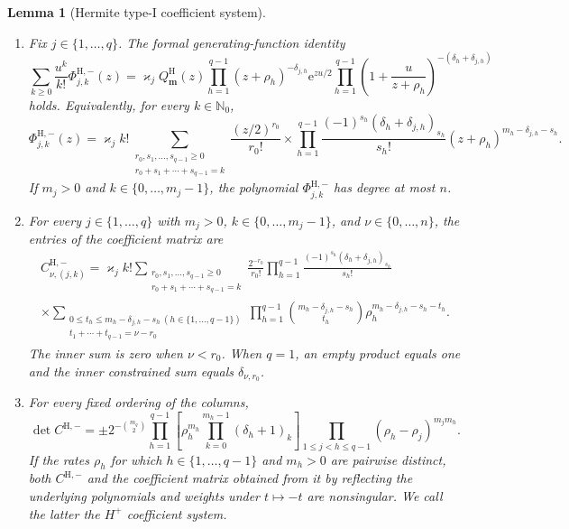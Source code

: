 \documentclass[10pt]{amsart}
\newcommand{\Nzero}{\mathbb N_0}
\newcommand{\e}{\mathrm e}
\newcommand{\mm}{\boldsymbol m}
\theoremstyle{plain}
\newtheorem{lemma}[theorem]{Lemma}
\theoremstyle{definition}
\theoremstyle{remark}
\begin{document}
\begin{lemma}[Hermite type-I coefficient system]
\label{lem:Hermite-connection-determinant}
\begin{enumerate}[label=\textnormal{(\roman*)}]
\item Fix \(j\in\{1,\ldots,q\}\). The formal generating-function
identity
\[
 \sum_{k\ge0}\frac{u^k}{k!}\Phi_{j,k}^{\mathrm H,-}(z)
 =\varkappa_j Q_{\mm}^{\mathrm H}(z)
 \prod_{h=1}^{q-1}(z+\rho_h)^{-\delta_{j,h}}
 \e^{zu/2}\prod_{h=1}^{q-1}
 \left(1+\frac{u}{z+\rho_h}\right)^{-
 (\delta_h+\delta_{j,h})}
\]
holds. Equivalently, for every \(k\in\Nzero\),
\begin{equation}
 \Phi_{j,k}^{\mathrm H,-}(z)
 =\varkappa_j k!
 \sum_{\substack{r_0,s_1,\ldots,s_{q-1}\ge0\\
                   r_0+s_1+\cdots+s_{q-1}=k}}
 \frac{(z/2)^{r_0}}{r_0!}
 \times\prod_{h=1}^{q-1}
 \frac{(-1)^{s_h}(\delta_h+\delta_{j,h})_{s_h}}{s_h!}
 (z+\rho_h)^{m_h-\delta_{j,h}-s_h}.
 \label{eq:Hermite-Phi-finite}
\end{equation}
If \(m_j>0\) and \(k\in\{0,\ldots,m_j-1\}\), the polynomial
\(\Phi_{j,k}^{\mathrm H,-}\) has degree at most \(n\).

\item For every \(j\in\{1,\ldots,q\}\) with \(m_j>0\),
\(k\in\{0,\ldots,m_j-1\}\), and \(\nu\in\{0,\ldots,n\}\), the entries
of the coefficient matrix are
\begin{multline}
 C^{\mathrm H,-}_{\nu,(j,k)}
 =\varkappa_j k!
 \sum_{\substack{r_0,s_1,\ldots,s_{q-1}\ge0\\
                   r_0+s_1+\cdots+s_{q-1}=k}}
 \frac{2^{-r_0}}{r_0!}
 \prod_{h=1}^{q-1}
 \frac{(-1)^{s_h}(\delta_h+\delta_{j,h})_{s_h}}{s_h!}
 \\\times\sum_{\substack{0\le t_h\le
 m_h-\delta_{j,h}-s_h\ (h\in\{1,\ldots,q-1\})\\
 t_1+\cdots+t_{q-1}=\nu-r_0}}
 \prod_{h=1}^{q-1}
 \binom{m_h-\delta_{j,h}-s_h}{t_h}
 \rho_h^{m_h-\delta_{j,h}-s_h-t_h}.
 \label{eq:Hermite-connection-entries}
\end{multline}
The inner sum is zero when \(\nu<r_0\). When \(q=1\), an empty product
equals one and the inner constrained sum equals \(\delta_{\nu,r_0}\).

\item For every fixed ordering of the columns,
\begin{equation}
 \det C^{\mathrm H,-}
 =\pm 2^{-\binom{m_q}{2}}
 \prod_{h=1}^{q-1}\left[
 \rho_h^{m_h}\prod_{k=0}^{m_h-1}(\delta_h+1)_k\right]
 \prod_{1\le j<h\le q-1}(\rho_h-\rho_j)^{m_jm_h}.
 \label{eq:Hermite-connection-determinant}
\end{equation}
If the rates \(\rho_h\) for which
\(h\in\{1,\ldots,q-1\}\) and \(m_h>0\) are pairwise
distinct, both \(C^{\mathrm H,-}\) and the coefficient matrix obtained
from it by reflecting the underlying polynomials and weights under
\(t\mapsto-t\) are nonsingular. We call the latter the \(H^+\)
coefficient system.
\end{enumerate}
\end{lemma}
\end{document}
